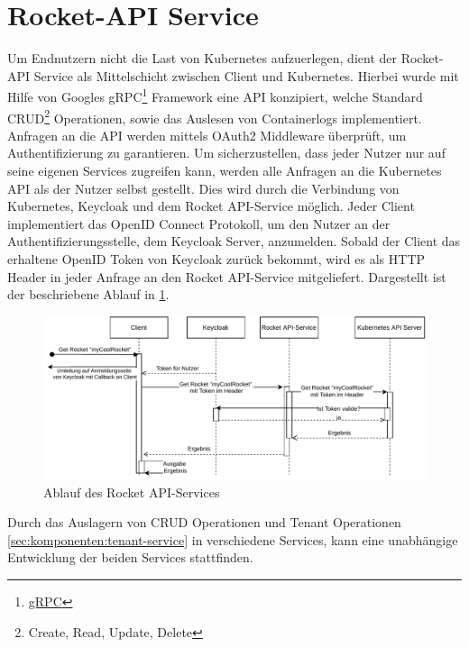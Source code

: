 \section{Rocket-API Service}
\label{sec:komponenten:rocket-api-service}
Um Endnutzern nicht die Last von Kubernetes aufzuerlegen, dient der Rocket-API Service als Mittelschicht zwischen
Client und Kubernetes. Hierbei wurde mit Hilfe von Googles gRPC\footnote{\href{https://grpc.io/}{gRPC}} Framework
eine API konzipiert, welche Standard CRUD\footnote{Create, Read, Update, Delete} Operationen, sowie das Auslesen
von Containerlogs implementiert.
Anfragen an die API werden mittels OAuth2 Middleware überprüft, um Authentifizierung zu garantieren. Um sicherzustellen,
dass jeder Nutzer nur auf seine eigenen Services zugreifen kann, werden alle Anfragen an die Kubernetes API als der
Nutzer selbst gestellt. Dies wird durch die Verbindung von Kubernetes, Keycloak und dem Rocket API-Service möglich.
Jeder Client implementiert das OpenID Connect Protokoll, um den Nutzer an der Authentifizierungsstelle, dem Keycloak
Server, anzumelden. Sobald der Client das erhaltene OpenID Token von Keycloak zurück bekommt,
wird es als HTTP Header in jeder Anfrage an den Rocket API-Service mitgeliefert.
Dargestellt ist der beschriebene Ablauf in \ref{fig:rocket-api-service-flow}.

\begin{figure}[h]
  \centering
  \includegraphics[height=0.5\textwidth]{gfx/chapters/3_komponenten/api-service-flow.pdf}
  \caption{Ablauf des Rocket API-Services}
  \label{fig:rocket-api-service-flow}
\end{figure}

Durch das Auslagern von CRUD Operationen und Tenant Operationen \ref{sec:komponenten:tenant-service} in
verschiedene Services, kann eine unabhängige Entwicklung der beiden Services stattfinden.